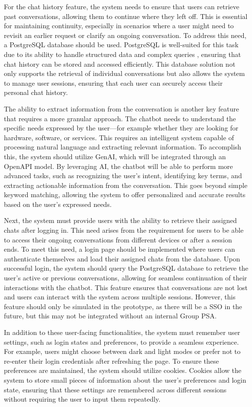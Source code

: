 For the chat history feature, the system needs to ensure that users can retrieve past conversations, allowing them to
continue where they left off. This is essential for maintaining continuity, especially in scenarios where a user might
need to revisit an earlier request or clarify an ongoing conversation. To address this need, a PostgreSQL database
should be used. PostgreSQL is well-suited for this task due to its ability to handle structured data and complex queries
, ensuring that chat history can be stored and accessed efficiently. This database solution not only supports the
retrieval of individual conversations but also allows the system to manage user sessions, ensuring that each user can
securely access their personal chat history.

The ability to extract information from the conversation is another key feature that requires a more granular approach.
The chatbot needs to understand the specific needs expressed by the user—for example whether they are looking for
hardware, software, or services. This requires an intelligent system capable of processing natural language and
extracting relevant information. To accomplish this, the system should utilize \ac{GenAI}, which will be integrated
through an OpenAPI model. By leveraging \ac{AI}, the chatbot will be able to perform more advanced tasks, such as
recognizing the user’s intent, identifying key terms, and extracting actionable information from the conversation. This
goes beyond simple keyword matching, allowing the system to offer personalized and accurate results based on the user's
expressed needs.

Next, the system must provide users with the ability to retrieve their assigned chats after logging in. This need arises
from the requirement for users to be able to access their ongoing conversations from different devices or after a
session ends. To meet this need, a login page should be implemented where users can authenticate themselves and load
their assigned chats from the database. Upon successful login, the system should query the PostgreSQL database to
retrieve the user’s active or previous conversations, allowing for seamless continuation of their interactions with the
chatbot. This feature ensures that conversations are not lost and users can interact with the system across multiple
sessions. However, this feature should only be simulated in the prototype, as there will be a \ac{SSO} in the future,
but this may not be integrated without an internal Group \ac{PSA}.

In addition to these user-facing functionalities, the system must remember user settings, such as login states and
preferences, to provide a seamless experience. For example, users might choose between dark and light modes or prefer
not to re-enter their login credentials after refreshing the page. To ensure these preferences are maintained, the
system should utilize cookies. Cookies allow the system to store small pieces of information about the user’s
preferences and login state, ensuring that these settings are remembered across different sessions without requiring the
user to input them repeatedly.

